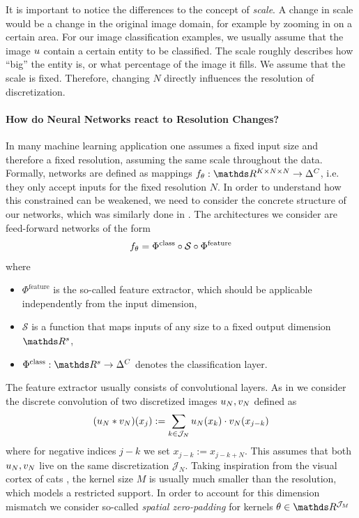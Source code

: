 It is important to notice the differences to the concept of \emph{scale}. A change in scale would be a change in the original image domain, for example by zooming in on a certain area. For our image classification examples, we usually assume that the image $u$ contain a certain entity to be classified. The scale roughly describes how \enquote{big} the entity is, or what percentage of the image it fills. We assume that the scale is fixed. Therefore, changing $N$ directly influences the resolution of discretization.

\paragraph{How do Neural Networks react to Resolution Changes?} In many machine learning application one assumes a fixed input size and therefore a fixed resolution, assuming the same scale throughout the data. Formally, networks are defined as mappings $\net_\param:\R^{K\times N\times N}\to\Delta^C$, i.e. they only accept inputs for the fixed resolution $N$. In order to understand how this constrained can be weakened, we need to consider the concrete structure of our networks, which was similarly done in \cite{kovachki2021universal, kabri2022FNO}. The architectures we consider are feed-forward networks of the form
%
\begin{align*}
f_\theta = \Phi^{\text{class}} \circ \mathcal{S}\circ \Phi^{\text{feature}}
\end{align*}
%
where 
%
\begin{itemize}
\item $\Phi^{\text{feature}}$ is the so-called feature extractor, which should be applicable independently from the input dimension,
\item $\mathcal{S}$ is a function that maps inputs of any size to a fixed output dimension $\R^s$,
\item $\Phi^{\text{class}}:\R^s\to\Delta^C$ denotes the classification layer.
\end{itemize}
%
%
%
The feature extractor usually consists of convolutional layers. As in \cite[Ch. 2]{kabri2022FNO} we consider the discrete convolution of two discretized images $u_N, v_N$ defined as 
%
\begin{align*}
(u_N\ast v_N)(x_j) := \sum_{k\in \mathcal{J}_N} u_N(x_k)\cdot v_N(x_{j-k})
\end{align*}
%
where for negative indices $j-k$ we set $x_{j-k} := x_{j-k+N}$. This assumes that both $u_N, v_N$ live on the same discretization $\mathcal{J}_N$. Taking inspiration from the visual cortex of cats \cite{hubel1962receptive}, the kernel size $M$ is usually much smaller than the resolution, which models a restricted support. In order to account for this dimension mismatch we consider so-called \emph{spatial zero-padding} for kernels $\param\in\R^{\mathcal{J}_M}$
